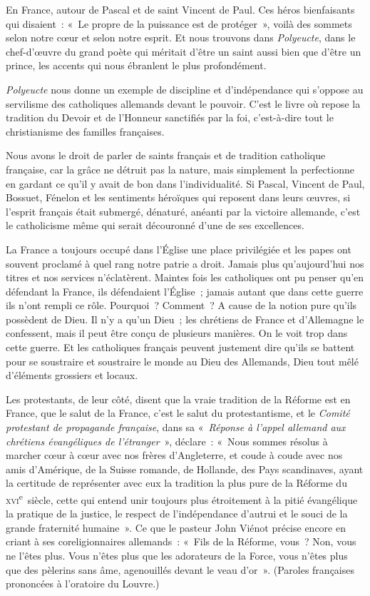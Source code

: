 \documentclass[french,twoside]{book} %
\begin{document}
En France, autour de Pascal et de saint Vincent de Paul. Ces héros bienfaisants qui disaient : « Le propre de la puissance est de protéger », voilà des sommets selon notre cœur et selon notre esprit. Et nous trouvons dans {\itshape Polyeucte}, dans le chef-d’œuvre du grand poète qui méritait d’être un saint aussi bien que d’être un prince, les accents qui nous ébranlent le plus profondément.‌\par
{\itshape Polyeucte} nous donne un exemple de discipline et d’indépendance qui s’oppose au servilisme des catholiques allemands devant le pouvoir. C’est le livre où repose la tradition du Devoir et de l’Honneur sanctifiés par la foi, c’est-à-dire tout le christianisme des familles françaises.‌\par
Nous avons le droit de parler de saints français et de tradition catholique française, car la grâce ne détruit pas la nature, mais simplement la perfectionne en gardant ce qu’il y avait de bon dans l’individualité. Si Pascal, Vincent de Paul, Bossuet, Fénelon et les sentiments héroïques qui reposent dans leurs œuvres, si l’esprit français était submergé, dénaturé, anéanti par la victoire allemande, c’est le catholicisme même qui serait découronné d’une de ses excellences.‌\par
La France a toujours occupé dans l’Église une place privilégiée et les papes ont souvent proclamé à quel rang notre patrie a droit. Jamais plus qu’aujourd’hui nos titres et nos services n’éclatèrent. Maintes fois les catholiques ont pu penser qu’en défendant la France, ils défendaient l’Église ; jamais autant que dans cette guerre ils n’ont rempli ce rôle. Pourquoi ? Comment ? A cause de la notion pure qu’ils possèdent de Dieu. Il n’y a qu’un Dieu ; les chrétiens de France et d’Allemagne le confessent, mais il peut être conçu de plusieurs manières. On le voit trop dans cette guerre. Et les catholiques français peuvent justement dire qu’ils se battent pour se soustraire et soustraire le monde au Dieu des Allemands, Dieu tout mêlé d’éléments grossiers et locaux.‌\par
Les protestants, de leur côté, disent que la vraie tradition de la Réforme est en France, que le salut de la France, c’est le salut du protestantisme, et le {\itshape Comité protestant de propagande française}, dans sa « {\itshape Réponse à l’appel allemand aux chrétiens évangéliques de l’étranger} », déclare : « Nous sommes résolus à marcher cœur à cœur avec nos frères d’Angleterre, et coude à coude avec nos amis d’Amérique, de la Suisse romande, de Hollande, des Pays scandinaves, ayant la certitude de représenter avec eux la tradition la plus pure de la Réforme du \textsc{xvi}\textsuperscript{e} siècle, cette qui entend unir toujours plus étroitement à la pitié évangélique la pratique de la justice, le respect de l’indépendance d’autrui et le souci de la grande fraternité humaine ». Ce que le pasteur John Viénot précise encore en criant à ses coreligionnaires allemands : « Fils de la Réforme, vous ? Non, vous ne l’êtes plus. Vous n’êtes plus que les adorateurs de la Force, vous n’êtes plus que des pèlerins sans âme, agenouillés devant le veau d’or ». (Paroles françaises prononcées à l’oratoire du Louvre.)‌\par
\end{document}
